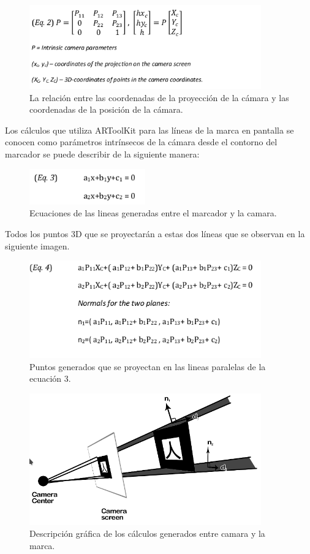 \begin{figure}[h!]
	\centering
	\includegraphics[width=10cm]{imagenes/marcoteorico/plataformas/eq02ArToolKit.png}
	\caption{La relación entre las coordenadas de la proyección de la cámara y las coordenadas de la posición de la cámara.\cite{B13}}
	\label{fig:analogo}
\end{figure}
Los cálculos que utiliza ARToolKit para las líneas de la marca en pantalla se conocen como parámetros intrínsecos de la cámara desde el contorno del marcador se puede describir de la siguiente manera:
\begin{figure}[h!]
	\centering
	\includegraphics[width=5cm]{imagenes/marcoteorico/plataformas/eq03ArToolKit.png}
	\caption{Ecuaciones de las lineas generadas entre el marcador y la camara.\cite{B13}}
	\label{fig:analogo}
\end{figure}
Todos los puntos 3D que se proyectarán a estas dos líneas que se observan en la siguiente imagen.
\begin{figure}[h!]
	\centering
	\includegraphics[width=10cm]{imagenes/marcoteorico/plataformas/eq04ArToolKit.png}
	\caption{Puntos generados que se proyectan en las lineas paralelas de la ecuación 3.\cite{B13}}
	\label{fig:analogo}
\end{figure}
\begin{figure}[h!]
	\centering
	\includegraphics[width=10cm]{imagenes/marcoteorico/plataformas/positionCameraARToolKit.png}
	\caption{Descripción gráfica de los cálculos generados entre camara y la marca.\cite{B13}}
	\label{fig:analogo}
\end{figure}

